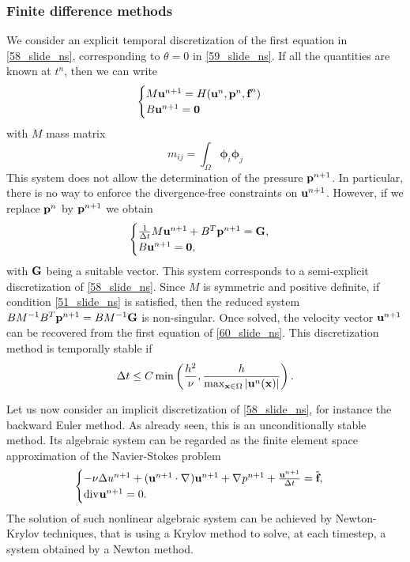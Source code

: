 \subsubsection*{Finite difference methods}
We consider an explicit temporal discretization of the first equation in \eqref{58_slide_ns}, corresponding to \(\theta = 0\) in \eqref{59_slide_ns}. If all the quantities are known at \(t^n\), then we can write
\begin{equation*}
    \begin{cases}
        M\textbf{u}^{n+1} = H(\textbf{u}^n, \textbf{p}^n,\textbf{f}^n) \\
        B\textbf{u}^{n+1} =\textbf{0}
    \end{cases}
\end{equation*}
with \(M\) mass matrix 
\[
    m_{ij} = \int_\Omega \bm{\phi}_i \bm{\phi}_j
\]
This system does not allow the determination of the pressure \(\textbf{p}^{n+1}\). In particular, there is no way to enforce the divergence-free constraints on \(\textbf{u}^{n+1}\). However, if we replace \(\textbf{p}^n\) by \(\textbf{p}^{n+1}\) we obtain 
\begin{equation}
    \begin{cases}
        \frac{1}{\Delta t} M \textbf{u}^{n+1} + B^T\textbf{p}^{n+1} = \textbf{G}, \\
        B\textbf{u}^{n+1} = \textbf{0} ,
    \end{cases}
    \label{60_slide_ns}
\end{equation}
with \(\textbf{G}\) being a suitable vector. This system corresponds to a semi-explicit discretization of \eqref{58_slide_ns}. Since \(M\) is symmetric and positive definite, if condition \eqref{51_slide_ns} is satisfied, then the reduced system \(BM^{-1}B^T \textbf{p}^{n+1} = BM^{-1}\textbf{G}\) is non-singular. Once solved, the velocity vector \(\textbf{u}^{n+1}\) can be recovered from the first equation of \eqref{60_slide_ns}. This discretization method is temporally stable if 
\[
    \Delta t \leq C\min\left( \frac{h^2}{\nu}, \frac{h}{\max_{\textbf{x}\in\Omega}\abs{\textbf{u}^n(\textbf{x})}} \right).
\]

Let us now consider an implicit discretization of \eqref{58_slide_ns}, for instance the backward Euler method. As already seen, this is an unconditionally stable method. Its algebraic system can be regarded as the finite element space approximation of the Navier-Stokes problem 
\begin{equation*}
    \begin{cases}
        -\nu\Delta u^{n+1} + (\textbf{u}^{n+1} \cdot \nabla\mspace{1mu})\textbf{u}^{n+1} + \nabla\mspace{1mu} p^{n+1} + \frac{\textbf{u}^{n+1}}{\Delta t} = \tilde{\textbf{f}}, \\
        \text{div}\mspace{1mu} \textbf{u}^{n+1} = 0.
    \end{cases}
\end{equation*}
The solution of such nonlinear algebraic system can be achieved by Newton-Krylov techniques, that is using a Krylov method to solve, at each timestep, a system obtained by a Newton method.
